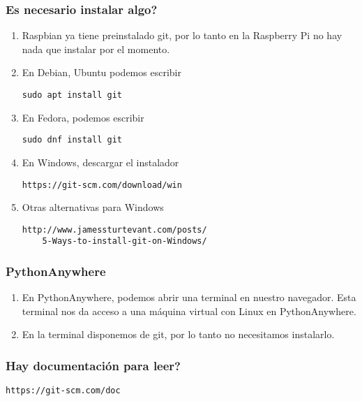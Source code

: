 \documentclass{beamer}
\begin{document}
\begin{frame}[fragile]
\frametitle{\textquestiondown Es necesario instalar algo?}

\begin{enumerate}
\item Raspbian ya tiene preinstalado git, por lo tanto en la Raspberry Pi no hay nada que instalar por el momento.

\item En Debian, Ubuntu podemos escribir
\begin{verbatim}
sudo apt install git
\end{verbatim}

\item En Fedora, podemos escribir
\begin{verbatim}
sudo dnf install git
\end{verbatim}

\item En Windows, descargar el instalador
\begin{verbatim}
https://git-scm.com/download/win
\end{verbatim}

\item Otras alternativas para Windows
\begin{verbatim}
http://www.jamessturtevant.com/posts/
    5-Ways-to-install-git-on-Windows/
\end{verbatim}

\end{enumerate}

\end{frame}

\begin{frame}
	\frametitle{PythonAnywhere}
	
\begin{enumerate}
	\item En PythonAnywhere, podemos abrir una terminal en nuestro navegador.
	Esta terminal nos da acceso a una máquina virtual con Linux en PythonAnywhere.
	
	\item En la terminal disponemos de git, por lo tanto no necesitamos instalarlo.
\end{enumerate}
\end{frame}

\begin{frame}[fragile]
\frametitle{\textquestiondown Hay documentaci\'{o}n para leer?}

\begin{verbatim}
https://git-scm.com/doc
\end{verbatim}

\end{frame}
\end{document}
